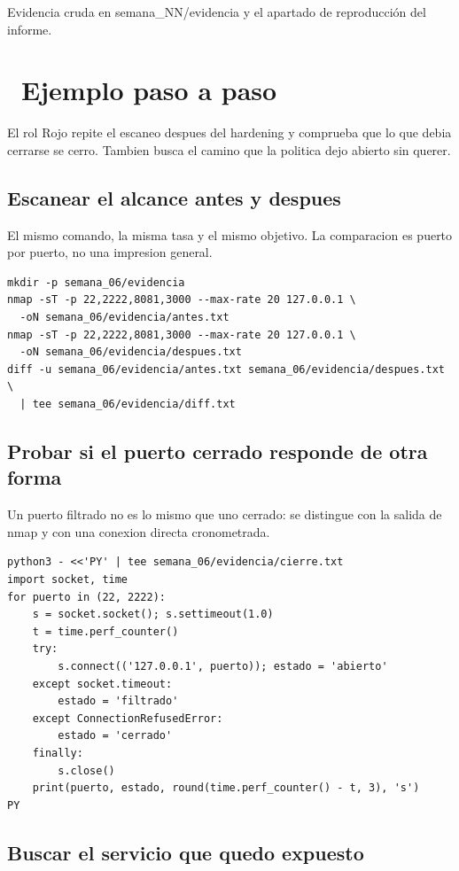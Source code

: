 \documentclass[11pt,a4paper]{article}
\newcommand{\iconotexto}[2]{\textcolor{cyanNeon}{\faIcon{#1}}~#2}
\begin{document}
Evidencia cruda en semana\_NN/evidencia y el apartado de reproducción del informe.

\section{\iconotexto{list-ol}{Ejemplo paso a paso}}

El rol Rojo repite el escaneo despues del hardening y comprueba que lo que debia cerrarse se cerro. Tambien busca el camino que la politica dejo abierto sin querer.

\subsection{Escanear el alcance antes y despues}

El mismo comando, la misma tasa y el mismo objetivo. La comparacion es puerto por puerto, no una impresion general.

\begin{lstlisting}[style=estiloCodigo]
mkdir -p semana_06/evidencia
nmap -sT -p 22,2222,8081,3000 --max-rate 20 127.0.0.1 \
  -oN semana_06/evidencia/antes.txt
nmap -sT -p 22,2222,8081,3000 --max-rate 20 127.0.0.1 \
  -oN semana_06/evidencia/despues.txt
diff -u semana_06/evidencia/antes.txt semana_06/evidencia/despues.txt \
  | tee semana_06/evidencia/diff.txt
\end{lstlisting}

\subsection{Probar si el puerto cerrado responde de otra forma}

Un puerto filtrado no es lo mismo que uno cerrado: se distingue con la salida de nmap y con una conexion directa cronometrada.

\begin{lstlisting}[style=estiloCodigo]
python3 - <<'PY' | tee semana_06/evidencia/cierre.txt
import socket, time
for puerto in (22, 2222):
    s = socket.socket(); s.settimeout(1.0)
    t = time.perf_counter()
    try:
        s.connect(('127.0.0.1', puerto)); estado = 'abierto'
    except socket.timeout:
        estado = 'filtrado'
    except ConnectionRefusedError:
        estado = 'cerrado'
    finally:
        s.close()
    print(puerto, estado, round(time.perf_counter() - t, 3), 's')
PY
\end{lstlisting}

\subsection{Buscar el servicio que quedo expuesto}
\end{document}
